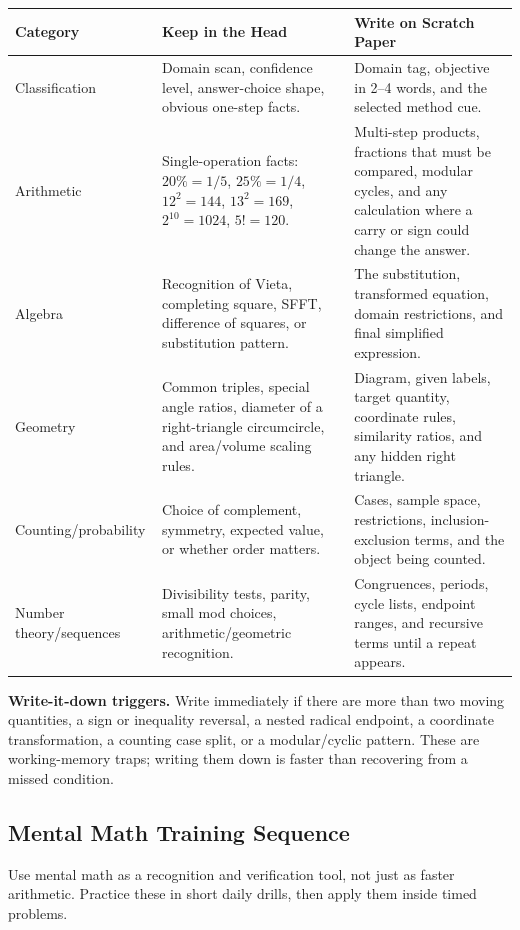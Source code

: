 \documentclass[11pt]{article}
\begin{document}
\begin{longtable}{@{}>{\raggedright\arraybackslash}p{} >{\raggedright\arraybackslash}p{} >{\raggedright\arraybackslash}p{}@{}}
\textbf{Category} & \textbf{Keep in the Head} & \textbf{Write on Scratch Paper}\\
\hline
Classification & Domain scan, confidence level, answer-choice shape, obvious one-step facts. & Domain tag, objective in 2--4 words, and the selected method cue.\\
Arithmetic & Single-operation facts: \(20\%=1/5\), \(25\%=1/4\), \(12^2=144\), \(13^2=169\), \(2^{10}=1024\), \(5!=120\). & Multi-step products, fractions that must be compared, modular cycles, and any calculation where a carry or sign could change the answer.\\
Algebra & Recognition of Vieta, completing square, SFFT, difference of squares, or substitution pattern. & The substitution, transformed equation, domain restrictions, and final simplified expression.\\
Geometry & Common triples, special angle ratios, diameter of a right-triangle circumcircle, and area/volume scaling rules. & Diagram, given labels, target quantity, coordinate rules, similarity ratios, and any hidden right triangle.\\
Counting/probability & Choice of complement, symmetry, expected value, or whether order matters. & Cases, sample space, restrictions, inclusion-exclusion terms, and the object being counted.\\
Number theory/sequences & Divisibility tests, parity, small mod choices, arithmetic/geometric recognition. & Congruences, periods, cycle lists, endpoint ranges, and recursive terms until a repeat appears.\\
\end{longtable}

\textbf{Write-it-down triggers.} Write immediately if there are more than two moving quantities, a sign or inequality reversal, a nested radical endpoint, a coordinate transformation, a counting case split, or a modular/cyclic pattern. These are working-memory traps; writing them down is faster than recovering from a missed condition.

\subsection{Mental Math Training Sequence}

Use mental math as a recognition and verification tool, not just as faster arithmetic. Practice these in short daily drills, then apply them inside timed problems.
\end{document}

